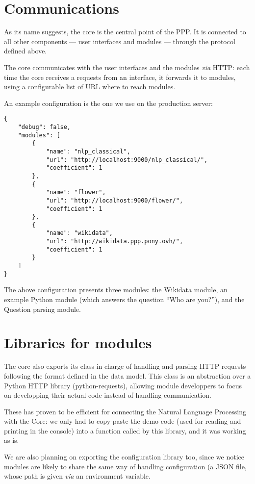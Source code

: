 \section{Communications}

As its name suggests, the core is the central point of the PPP. It is
connected to all other components — user interfaces and modules — through
the protocol defined above.

The core communicates with the user interfaces and the modules {\em via} HTTP:
each time the core receives a requests from an interface, it forwards it
to modules, using a configurable list of URL where to reach modules.

An example configuration is the one we use on the production server:

\begin{verbatim}
{
    "debug": false,
    "modules": [
        {
            "name": "nlp_classical",
            "url": "http://localhost:9000/nlp_classical/",
            "coefficient": 1
        },
        {
            "name": "flower",
            "url": "http://localhost:9000/flower/",
            "coefficient": 1
        },
        {
            "name": "wikidata",
            "url": "http://wikidata.ppp.pony.ovh/",
            "coefficient": 1
        }
    ]
}
\end{verbatim}

The above configuration presents three modules: the Wikidata module, an example 
Python module (which answers the question  “Who are you?”), and the Question parsing module.

\section{Libraries for modules}

The core also exports its class in charge of handling and parsing HTTP
requests following the format defined in the data model.
This class is an abstraction over a Python HTTP library (python-requests),
allowing module developpers to focus on developping their actual code
instead of handling communication.

These has proven to be efficient for connecting the Natural Language
Processing with the Core: we only had to copy-paste the demo code
(used for reading and printing in the console) into a function called
by this library, and it was working as is.


We are also planning on exporting the configuration
library too, since we notice modules are likely to share the
same way of handling configuration (a JSON file, whose path
is given {\em via} an environment variable.

